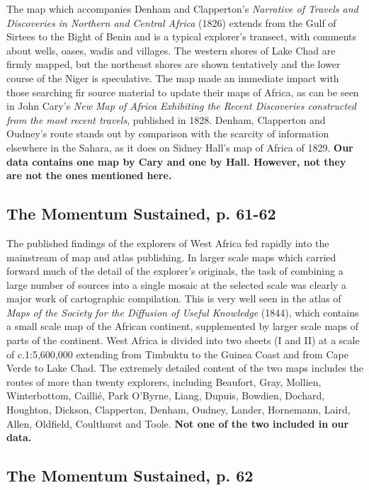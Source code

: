 \documentclass[12pt]{article}
\begin{document}
The map which accompanies Denham and Clapperton's \textit{Narrative of Travels
and Discoveries in Northern and Central Africa} (1826) extends from the Gulf of
Sirtees to the Bight of Benin and is a typical explorer's transect, with
comments about wells, oases, wadis and villages. The western shores of Lake Chad
are firmly mapped, but the northeast shores are shown tentatively and the lower
course of the Niger is speculative. The map made an immediate impact with those
searching fir source material to update their maps of Africa, as can be seen in
John Cary's \textit{New Map of Africa Exhibiting the Recent Discoveries
constructed from the most recent travels}, published in 1828. Denham, Clapperton
and Oudney's route stands out by comparison with the scarcity of information
elsewhere in the Sahara, as it does on Sidney Hall's map of Africa of 1829.
\textbf{Our data contains one map by Cary and one by Hall. However, not they are
	not the ones mentioned here.}

\subsection{The Momentum Sustained, p. 61-62}
The published findings of the explorers of West Africa fed rapidly into the
mainstream of map and atlas publishing. In larger scale maps which carried
forward much of the detail of the explorer's originals, the task of combining a
large number of sources into a single mosaic at the selected scale was clearly a
major work of cartographic compilation. This is very well seen in the atlas of
\textit{Maps of the Society for the Diffusion of Useful Knowledge} (1844), which
contains a small scale map of the African continent, supplemented by larger
scale maps of parts of the continent. West Africa is divided into two sheets (I
and II) at a scale of c.1:5,600,000 extending from Timbuktu to the Guinea Coast
and from Cape Verde to Lake Chad. The extremely detailed content of the two maps
includes the routes of more than twenty explorers, including Beaufort, Gray,
Mollien, Winterbottom, Caillié, Park O'Byrne, Liang, Dupuis, Bowdien, Dochard,
Houghton, Dickson, Clapperton, Denham, Oudney, Lander, Hornemann, Laird, Allen,
Oldfield, Coulthurst and Toole. \textbf{Not one of the two included in our data.}

\subsection{The Momentum Sustained, p. 62}
\end{document}
